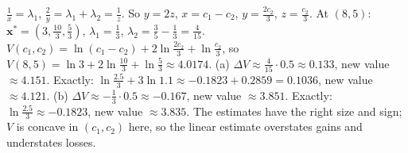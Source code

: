 \begin{solutions}
        $\tfrac1x=\lambda_1$, $\tfrac2y=\lambda_1+\lambda_2=\tfrac1z$. So
        $y=2z$, $x=c_1-c_2$, $y=\tfrac{2c_2}3$, $z=\tfrac{c_2}3$. At
        $(8,5)$: $\mathbf{x}^*=(3,\tfrac{10}3,\tfrac53)$,
        $\lambda_1=\tfrac13$, $\lambda_2=\tfrac35-\tfrac13=\tfrac4{15}$.
        $V(c_1,c_2)=\ln(c_1-c_2)+2\ln\tfrac{2c_2}{3}+\ln\tfrac{c_2}{3}$,
        so $V(8,5)=\ln3+2\ln\tfrac{10}3+\ln\tfrac53\approx4.0174$.
        (a) $\Delta V\approx\tfrac4{15}\cdot0.5\approx0.133$, new value
        $\approx4.151$. Exactly:
        $\ln\tfrac{2.5}{3}+3\ln1.1\approx-0.1823+0.2859=0.1036$, new value
        $\approx4.121$.
        (b) $\Delta V\approx-\tfrac13\cdot0.5\approx-0.167$, new value
        $\approx3.851$. Exactly: $\ln\tfrac{2.5}{3}\approx-0.1823$, new value
        $\approx3.835$. The estimates have the right size
        and sign; $V$ is concave in $(c_1,c_2)$ here, so the linear estimate
        overstates gains and understates losses.
\end{solutions}
